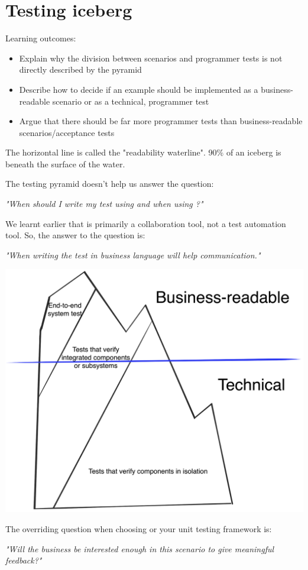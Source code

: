 \chapter*{Testing iceberg}

\ifnotes

    Learning outcomes:
    
    \begin{itemize}
        \item Explain why the division between scenarios and programmer tests is not directly described by the pyramid
        \item Describe how to decide if an example should be implemented as a business-readable scenario or as a technical, programmer test
        \item Argue that there should be far more programmer tests than business-readable scenarios/acceptance tests
    \end{itemize}

    The horizontal line is called the "readability waterline". 90\% of an iceberg is beneath the surface of the water.
\fi 

\ifcontent 
    The testing pyramid doesn't help us answer the question:
    
    \setlength{\leftskip}{1cm}
    
        \textit{"When should I write my test using \CUKE{} and when using ?"}
    
    \setlength{\leftskip}{0pt}
    
    We learnt earlier that \CUKE{} is primarily a collaboration tool, not a test automation tool. So, the answer to the question is:
    
    \setlength{\leftskip}{1cm}
    
        \textit{"When writing the test in business language will help communication."}
    
    \setlength{\leftskip}{0pt}
    
    \includegraphics[width=\textwidth]{images/iceberg}
    
    The overriding question when choosing \CUKE{} or your unit testing framework is:
    
    \setlength{\leftskip}{1cm}
    
        \textit{"Will the business be interested enough in this scenario to give meaningful feedback?"}
    
    \setlength{\leftskip}{0pt}
\fi